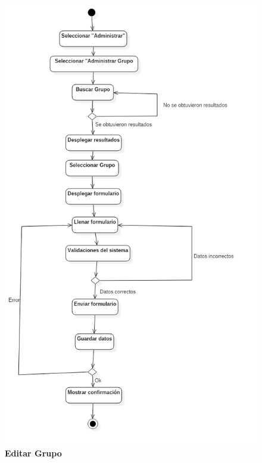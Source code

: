 \begin{figure}[H]
  \centering
    \includegraphics[scale=.6,angle=0]{project/Actividades/Editar_Grupo.jpg}
  \caption{\textbf{Editar Grupo}}
\end{figure}
